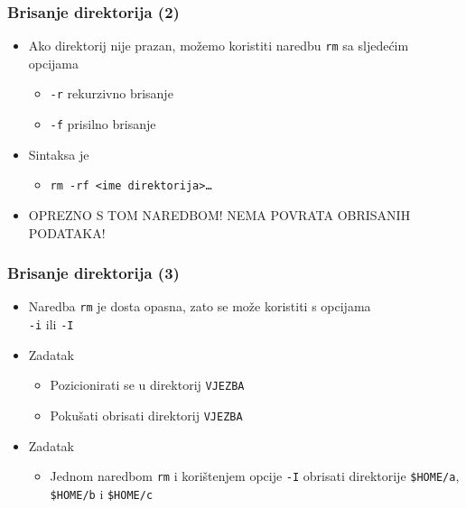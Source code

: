 \documentclass{beamer}
\begin{document}
\begin{frame}[t]
\frametitle{Brisanje direktorija (2)}
\begin{itemize}
  \item Ako direktorij nije prazan, možemo koristiti naredbu \texttt{rm}
        sa sljedećim opcijama
  \begin{itemize}
    \item \texttt{-r} rekurzivno brisanje
    \item \texttt{-f} prisilno brisanje
  \end{itemize}
  \item Sintaksa je 
  \begin{itemize}
    \item[] \texttt{rm -rf \textless ime direktorija\textgreater\ldots}
  \end{itemize}
  \item[] OPREZNO S TOM NAREDBOM! NEMA POVRATA OBRISANIH PODATAKA!
\end{itemize}
\end{frame}

\begin{frame}[t]
\frametitle{Brisanje direktorija (3)}
\begin{itemize}
  \item Naredba \texttt{rm} je dosta opasna, zato se može koristiti s 
        opcijama \\\texttt{-i} ili \texttt{-I}
  \item Zadatak
  \begin{itemize}
    \item Pozicionirati se u direktorij \texttt{VJEZBA}
    \item Pokušati obrisati direktorij \texttt{VJEZBA}
  \end{itemize}
  \item Zadatak
  \begin{itemize}
    \item Jednom naredbom \texttt{rm} i korištenjem opcije \texttt{-I} 
          obrisati direktorije \texttt{\$HOME/a}, \texttt{\$HOME/b} i 
          \texttt{\$HOME/c}
  \end{itemize}
\end{itemize}
\end{frame}
\end{document}
